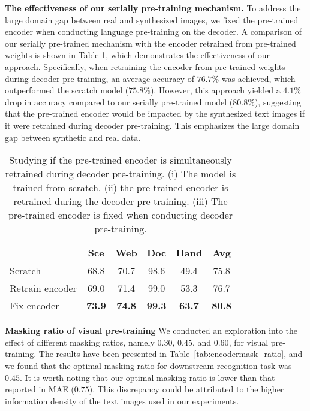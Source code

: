 \vspace{2mm}
\noindent\textbf{The effectiveness of our  serially pre-training mechanism.} To address the large domain gap between real and synthesized images, we fixed the pre-trained encoder when conducting language pre-training on the decoder. A comparison of our serially pre-trained mechanism with the encoder retrained from pre-trained weights is shown in Table \ref{tab:retraining_vs_fixing}, which demonstrates the effectiveness of our approach. Specifically, when retraining the encoder from pre-trained weights during decoder pre-training, an average accuracy of $76.7\%$ was achieved, which outperformed the scratch model ($75.8\%$). However, this approach yielded a $4.1\%$ drop in accuracy compared to our serially pre-trained model ($80.8\%$), suggesting that the pre-trained encoder would be impacted by the synthesized text images if it were retrained during decoder pre-training. This emphasizes the large domain gap between synthetic and real data.



\begin{table}[!t]
  \caption{Studying if the pre-trained encoder is simultaneously retrained during decoder pre-training. (i) The model is trained from scratch. (ii) the pre-trained encoder is retrained during the decoder pre-training. (iii) The pre-trained encoder is fixed when conducting decoder pre-training.}
  \label{tab:retraining_vs_fixing}
  \centering
  \setlength{\tabcolsep}{7pt}
  \begin{tabular}{lccccc}
    \toprule
    &Sce &Web &Doc &Hand &Avg\\
    \midrule
    Scratch &68.8 &70.7 &98.6 &49.4 &75.8 \\
    Retrain encoder &69.0 &71.4 &99.0 &53.3 &76.7 \\
    Fix encoder &\textbf{73.9} &\textbf{74.8} &\textbf{99.3} &\textbf{63.7} &\textbf{80.8} \\
  \bottomrule
\end{tabular}
\end{table}

\vspace{2mm}
\noindent\textbf{Masking ratio of visual pre-training} We conducted an exploration into the effect of different masking ratios, namely $0.30$, $0.45$, and $0.60$, for visual pre-training. The results have been presented in Table~\ref{tab:encodermask_ratio}, and we found that the optimal masking ratio for downstream recognition task was $0.45$. It is worth noting that our optimal masking ratio is lower than that reported in MAE \cite{mae} ($0.75$). This discrepancy could be attributed to the higher information density of the text images used in our experiments.


